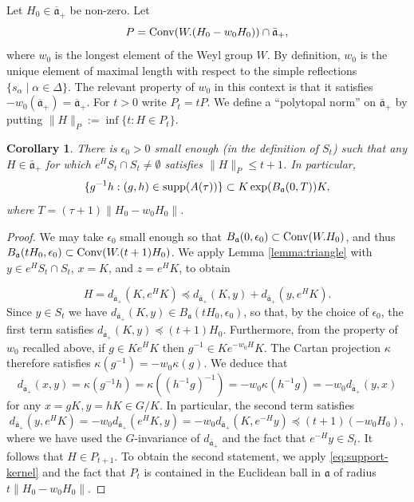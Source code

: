 \documentclass[12pt]{amsart}
\newtheorem{corollary}[theorem]{Corollary}
\theoremstyle{remark}
\newcommand{\ga}{\mathfrak a}
\begin{document}
Let $H_0\in\overline{\ga}_+$ be non-zero. Let 
\begin{equation}\label{defn:P}
P= \textnormal{Conv}(W.(H_0 -w_0H_0)) \cap \bar{\ga}_+,
\end{equation}
where $w_0$ is the longest element of the Weyl group $W$. By definition, $w_0$ is the unique element of maximal length with respect to the simple reflections $\{s_\alpha\mid \alpha\in\Delta\}$. The relevant property of $w_0$ in this context is that it satisfies $-w_0(\overline{\ga}_+)=\overline{\ga}_+$. For $t>0$ write $P_t=tP$. We define a ``polytopal norm'' on $\bar{\ga}_+$ by putting $\|H\|_P := \inf \{t : H \in P_t \}$. 

\begin{corollary}\label{cor:intersection-range}
There is $\epsilon_0>0$ small enough (in the definition of $S_t$) such that any $H \in \bar{\ga}_+$ for which $e^H S_t \cap S_t \neq \emptyset$ satisfies $\|H\|_P \leq t + 1$. In particular,
\[
\{g^{-1}h: (g,h)\in {\rm supp}(A(\tau))\}\subset K\exp(B_\ga (0,T))K,
\]
where $T=(\tau+1)\|H_0-w_0 H_0\|$.
\end{corollary}

\begin{proof}
We may take $\epsilon_0$ small enough so that $B_{\ga}(0, \epsilon_0) \subset \textnormal{Conv}(W.H_0)$, and thus $B_{\ga}(t H_0, \epsilon_0) \subset \textnormal{Conv}(W.(t + 1)H_0)$. We apply Lemma \ref{lemma:triangle} with $y \in e^H S_t \cap S_t$, $x =K$, and $z = e^H K$, to obtain

\[
H = d_{\bar{\ga}_+}(K, e^H K)  \preceq d_{\bar{\ga}_+}(K, y) + d_{\bar{\ga}_+}(y, e^H K).
\]
Since $y\in S_t$ we have $d_{\bar{\ga}_+}(K, y)\in  B_{\ga}(t H_0, \epsilon_0) $, so that, by the choice of $\epsilon_0$, the first term satisfies $d_{\bar{\ga}_+}(K, y) \preceq (t + 1)H_0$. Furthermore, from the property of $w_0$ recalled above, if $g\in Ke^HK$ then $g^{-1}\in Ke^{-w_0H}K$. The Cartan projection $\kappa$ therefore satisfies $\kappa(g^{-1})=-w_0\kappa(g)$. We deduce that
\[
d_{\bar{\ga}_+}(x,y)=\kappa(g^{-1}h)=\kappa((h^{-1}g)^{-1})=-w_0\kappa(h^{-1}g)=-w_0d_{\bar{\ga}_+}(y,x)
\]
for any $x=gK,y=hK\in G/K$. In particular, the second term satisfies
\[
d_{\bar{\ga}_+}(y, e^H K)=-w_0d_{\bar{\ga}_+}(e^H K,y)=-w_0d_{\bar{\ga}_+}(K,e^{-H}y)\preceq (t+1) (-w_0H_0),
\]
where we have used the $G$-invariance of $d_{\bar{\ga}_+}$ and the fact that $e^{-H}y\in S_t$. It follows that $H\in P_{t+1}$. To obtain the second statement, we apply \eqref{eq:support-kernel} and the fact that $P_t$ is contained in the Euclidean ball in $\ga$ of radius $t\|H_0-w_0 H_0\|$.
\end{proof}
\end{document}
